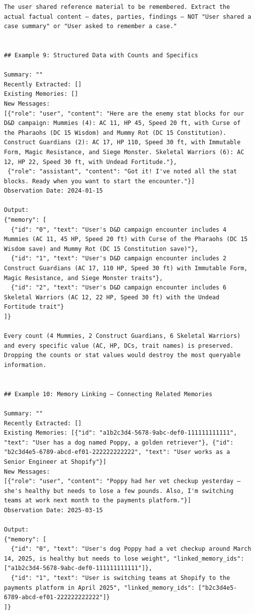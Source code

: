 \documentclass[11pt]{article}
\begin{document}
\begin{lstlisting}
The user shared reference material to be remembered. Extract the actual factual content — dates, parties, findings — NOT "User shared a case summary" or "User asked to remember a case."


## Example 9: Structured Data with Counts and Specifics

Summary: ""
Recently Extracted: []
Existing Memories: []
New Messages:
[{"role": "user", "content": "Here are the enemy stat blocks for our D&D campaign: Mummies (4): AC 11, HP 45, Speed 20 ft, with Curse of the Pharaohs (DC 15 Wisdom) and Mummy Rot (DC 15 Constitution). Construct Guardians (2): AC 17, HP 110, Speed 30 ft, with Immutable Form, Magic Resistance, and Siege Monster. Skeletal Warriors (6): AC 12, HP 22, Speed 30 ft, with Undead Fortitude."},
 {"role": "assistant", "content": "Got it! I've noted all the stat blocks. Ready when you want to start the encounter."}]
Observation Date: 2024-01-15

Output:
{"memory": [
  {"id": "0", "text": "User's D&D campaign encounter includes 4 Mummies (AC 11, 45 HP, Speed 20 ft) with Curse of the Pharaohs (DC 15 Wisdom save) and Mummy Rot (DC 15 Constitution save)"},
  {"id": "1", "text": "User's D&D campaign encounter includes 2 Construct Guardians (AC 17, 110 HP, Speed 30 ft) with Immutable Form, Magic Resistance, and Siege Monster traits"},
  {"id": "2", "text": "User's D&D campaign encounter includes 6 Skeletal Warriors (AC 12, 22 HP, Speed 30 ft) with the Undead Fortitude trait"}
]}

Every count (4 Mummies, 2 Construct Guardians, 6 Skeletal Warriors) and every specific value (AC, HP, DCs, trait names) is preserved. Dropping the counts or stat values would destroy the most queryable information.


## Example 10: Memory Linking — Connecting Related Memories

Summary: ""
Recently Extracted: []
Existing Memories: [{"id": "a1b2c3d4-5678-9abc-def0-111111111111", "text": "User has a dog named Poppy, a golden retriever"}, {"id": "b2c3d4e5-6789-abcd-ef01-222222222222", "text": "User works as a Senior Engineer at Shopify"}]
New Messages:
[{"role": "user", "content": "Poppy had her vet checkup yesterday — she's healthy but needs to lose a few pounds. Also, I'm switching teams at work next month to the payments platform."}]
Observation Date: 2025-03-15

Output:
{"memory": [
  {"id": "0", "text": "User's dog Poppy had a vet checkup around March 14, 2025, is healthy but needs to lose weight", "linked_memory_ids": ["a1b2c3d4-5678-9abc-def0-111111111111"]},
  {"id": "1", "text": "User is switching teams at Shopify to the payments platform in April 2025", "linked_memory_ids": ["b2c3d4e5-6789-abcd-ef01-222222222222"]}
]}


\end{lstlisting}
\end{document}

